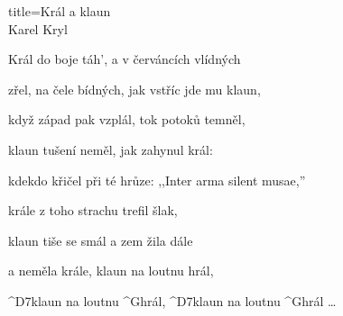 \begin{song}{title=\centering Král a klaun \\\normalsize Karel Kryl  \vspace*{-0.3cm}}
{\sloka
	Král do boje táh', a v červáncích vlídných

	zřel, na čele bídných, jak vstříc jde mu klaun,

	když západ pak vzplál, tok potoků temněl,

	klaun tušení neměl, jak zahynul král:

	kdekdo křičel při té hrůze: ,,Inter arma silent musae,''

	krále z toho strachu trefil šlak,

	klaun tiše se smál a zem žila dále
	
	a neměla krále, klaun na loutnu hrál,

	^{D7}klaun na loutnu ^{G}hrál, ^{D7}klaun na loutnu ^{G}hrál \ldots




}
\setcounter{Slokočet}{0}
\end{song}
